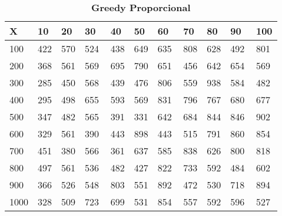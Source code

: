 \documentclass[10pt,letterpaper]{article}
\begin{document}
\begin{center}
\begin{table}\renewcommand{\arraystretch}{2.5}
\caption{\large \textbf{Greedy Proporcional}}
\centering
\begin{tabular} { |m{0.5cm}|m{1.3cm}|m{1.3cm}|m{1.3cm}|m{1.3cm}|m{1.3cm}|m{1.3cm}|m{1.3cm}|m{1.3cm}|m{1.3cm}|m{1.3cm}|} 
\hline
\rowcolor{Gray}
\centering \textbf{X} & \centering \textbf{10} & \centering \textbf{20} & \centering \textbf{30}\ & \centering \textbf{40} & \centering \textbf{50} & \centering \textbf{60}\ & \centering \textbf{70} & \centering \textbf{80} & \centering \textbf{90}\ & \textbf{100} \\\hline
\cellcolor{Gray}100 & \Large 422 & \Large 570 & \Large 524 & \Large 438 & \Large 649 & \Large 635 & \Large 808 & \Large 628 & \Large 492 & \Large 801 \\
\hline
\cellcolor{Gray}200 & \Large 368 & \Large 561 & \Large 569 & \Large 695 & \Large 790 & \Large 651 & \Large 456 & \Large 642 & \Large 654 & \Large 569 \\
\hline
\cellcolor{Gray}300 & \Large 285 & \Large 450 & \Large 568 & \Large 439 & \Large 476 & \Large 806 & \Large 559 & \Large 938 & \Large 584 & \Large 482 \\
\hline
\cellcolor{Gray}400 & \Large 295 & \Large 498 & \Large 655 & \Large 593 & \Large 569 & \Large 831 & \Large 796 & \Large 767 & \Large 680 & \Large 677 \\
\hline
\cellcolor{Gray}500 & \Large 347 & \Large 482 & \Large 565 & \Large 391 & \Large 331 & \Large 642 & \Large 684 & \Large 844 & \Large 846 & \Large 902 \\
\hline
\cellcolor{Gray}600 & \Large 329 & \Large 561 & \Large 390 & \Large 443 & \Large 898 & \Large 443 & \Large 515 & \Large 791 & \Large 860 & \Large 854 \\
\hline
\cellcolor{Gray}700 & \Large 451 & \Large 380 & \Large 566 & \Large 361 & \Large 637 & \Large 585 & \Large 838 & \Large 626 & \Large 800 & \Large 818 \\
\hline
\cellcolor{Gray}800 & \Large 497 & \Large 561 & \Large 536 & \Large 482 & \Large 427 & \Large 822 & \Large 733 & \Large 592 & \Large 484 & \Large 602 \\
\hline
\cellcolor{Gray}900 & \Large 366 & \Large 526 & \Large 548 & \Large 803 & \Large 551 & \Large 892 & \Large 472 & \Large 530 & \Large 718 & \Large 894 \\
\hline
\cellcolor{Gray}1000 & \Large 328 & \Large 509 & \Large 723 & \Large 699 & \Large 531 & \Large 854 & \Large 557 & \Large 592 & \Large 596 & \Large 527 \\
\hline
\end{tabular} \\
\end{table}
\end{center}
\end{document}
